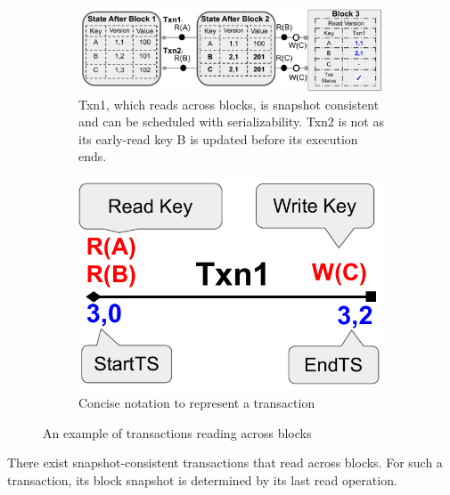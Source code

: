 {\begin{figure}[tp] \centering
  \begin{subfigure}{0.7\textwidth}
    \includegraphics[width=0.99\textwidth]{diagram/txn/theory_snapshot.pdf}
    \caption{Txn1, which reads across blocks, is snapshot consistent and can be
    scheduled with serializability. Txn2 is not as its early-read key B
    is updated before its execution ends.}
    \label{diagram:txn:theory_snapshot}
  \end{subfigure}\hfill
  \begin{subfigure}{0.27\textwidth}
    \includegraphics[width=0.99\textwidth]{diagram/txn/theory_notation.pdf}
    \caption{Concise notation to represent a transaction}
    \label{diagram:txn:theory_notation}
  \end{subfigure}
  \caption{An example of transactions reading across blocks}
\end{figure}

\begin{proposition}
  \label{proposition:crossblockRead}
  There exist snapshot-consistent transactions that read across blocks. For such
  a transaction, its block snapshot is determined by its last read operation.
\end{proposition}

}
